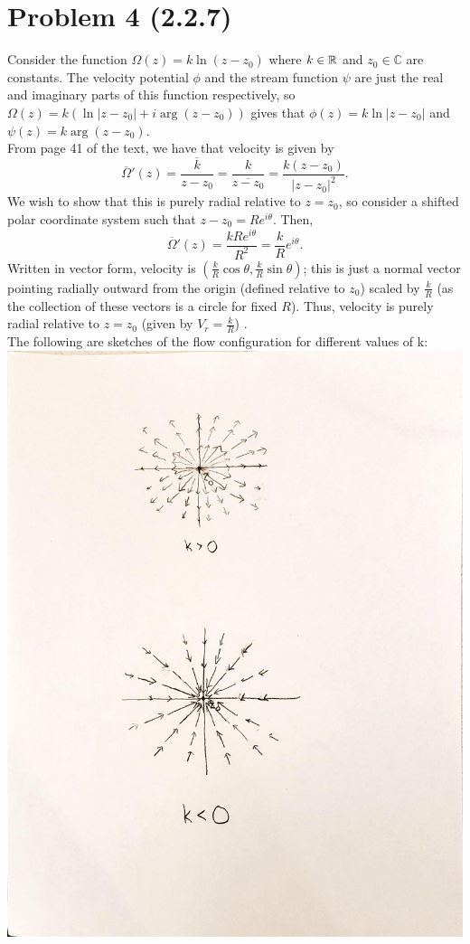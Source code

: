 \documentclass{article}
\begin{document}
\section{Problem 4 (2.2.7)}
Consider the function $\Omega(z)=k\ln(z-z_0)$ where $k\in\mathbb{R}$ and $z_0\in\mathbb{C}$ are constants. The velocity potential $\phi$ and the stream function $\psi$ are just the real and imaginary parts of this function respectively, so $\Omega(z)=k(\ln|z-z_0|+i\arg(z-z_0))$ gives that $\phi(z)=k\ln|z-z_0|$ and $\psi(z)=k\arg(z-z_0)$.\\
From page 41 of the text, we have that velocity is given by
\[
\overline{\Omega}'(z)=\overline{\frac{k}{z-z_0}}=\frac{k}{\overline{z-z_0}}=\frac{k(z-z_0)}{|z-z_0|^2}.
\]
We wish to show that this is purely radial relative to $z=z_0$, so consider a shifted polar coordinate system such that $z-z_0=Re^{i\theta}$. Then, 
\[
\overline{\Omega}'(z)=\frac{kRe^{i\theta}}{R^2}=\frac{k}{R}e^{i\theta}.
\]
Written in vector form, velocity is $(\frac{k}{R}\cos\theta,\frac{k}{R}\sin\theta)$; this is just a normal vector pointing radially outward from the origin (defined relative to $z_0$) scaled by $\frac{k}{R}$ (as the collection of these vectors is a circle for fixed $R$). Thus, velocity is purely radial relative to $z=z_0$ (given by $V_r=\frac{k}{R}$) .\\
The following are sketches of the flow configuration for different values of k:\\
\includegraphics[scale=0.4]{567hw3fig3.pdf}\\
\end{document}
